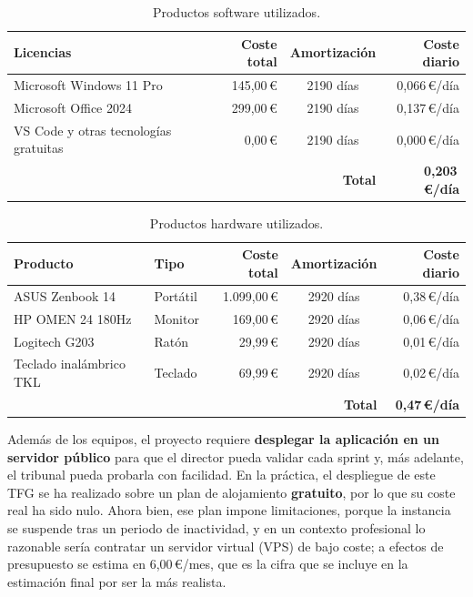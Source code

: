 \begin{table}[H]
	\centering
	\caption{Productos software utilizados.}
	\label{tab:software}
	\begin{tabularx}{\textwidth}{X r c r}
		\toprule
		\textbf{Licencias} & \textbf{Coste total} & \textbf{Amortización} & \textbf{Coste diario} \\
		\midrule
		Microsoft Windows 11 Pro               & 145,00\,\euro{} & 2190 días & 0,066\,\euro{}/día \\
		Microsoft Office 2024                   & 299,00\,\euro{} & 2190 días & 0,137\,\euro{}/día \\
		VS Code y otras tecnologías gratuitas  & 0,00\,\euro{}   & 2190 días & 0,000\,\euro{}/día \\
		\midrule
		\multicolumn{3}{r}{\textbf{Total}} & \textbf{0,203\,\euro{}/día} \\
		\bottomrule
	\end{tabularx}
\end{table}

\begin{table}[H]
	\centering
	\caption{Productos hardware utilizados.}
	\label{tab:hardware}
	\begin{tabularx}{\textwidth}{X l r c r}
		\toprule
		\textbf{Producto} & \textbf{Tipo} & \textbf{Coste total} & \textbf{Amortización} & \textbf{Coste diario} \\
		\midrule
		ASUS Zenbook 14         & Portátil & 1.099,00\,\euro{} & 2920 días & 0,38\,\euro{}/día \\
		HP OMEN 24 180Hz        & Monitor  & 169,00\,\euro{}   & 2920 días & 0,06\,\euro{}/día \\
		Logitech G203           & Ratón    & 29,99\,\euro{}    & 2920 días & 0,01\,\euro{}/día \\
		Teclado inalámbrico TKL & Teclado  & 69,99\,\euro{}    & 2920 días & 0,02\,\euro{}/día \\
		\midrule
		\multicolumn{4}{r}{\textbf{Total}} & \textbf{0,47\,\euro{}/día} \\
		\bottomrule
	\end{tabularx}
\end{table}

Además de los equipos, el proyecto requiere \textbf{desplegar la aplicación en un servidor público}
para que el director pueda validar cada sprint y, más adelante, el tribunal pueda probarla con
facilidad. En la práctica, el despliegue de este TFG se ha realizado sobre un plan de alojamiento
\textbf{gratuito}, por lo que su coste real ha sido nulo. Ahora bien, ese plan impone
limitaciones, porque la instancia se suspende tras un periodo de inactividad, y en un contexto profesional lo
razonable sería contratar un servidor virtual (VPS) de bajo coste; a efectos de presupuesto se estima
en 6,00\,\euro{}/mes, que es la cifra que se incluye en la estimación final por ser la más realista.

